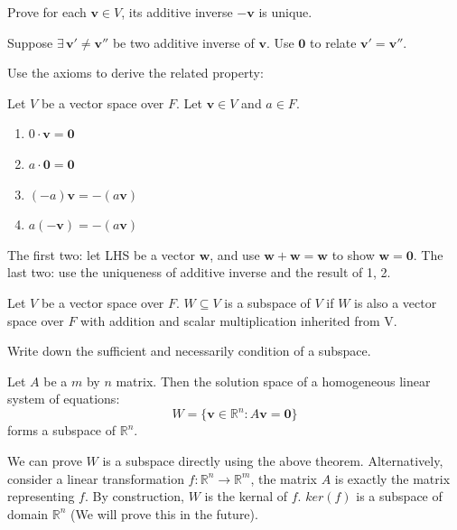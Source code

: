 \documentclass[12pt]{article}
\begin{document}
\begin{exercise}
    Prove for each $\mathbf{v}\in V$, its additive inverse $-\mathbf{v}$ is unique.
\end{exercise}
\begin{pf}
Suppose $\exists\,\mathbf{v'}\neq \mathbf{v''}$ be two additive inverse of $\mathbf{v}.$
Use $\mathbf{0}$ to relate $\mathbf{v'}=\mathbf{v''}.$
\end{pf}


Use the axioms to derive the related property:
\begin{property}
Let $V$ be a vector space over $F$. Let $\mathbf{v}\in V$ and $a\in F$.
\begin{enumerate}
    \item $0\cdot\mathbf{v}=\mathbf{0}$
    \item $a\cdot\mathbf{0}=\mathbf{0}$
    \item $(-a)\mathbf{v} = -(a\mathbf{v})$
    \item $a(-\mathbf{v}) = -(a\mathbf{v})$
\end{enumerate}
\end{property}

\begin{pf}
    The first two: let LHS be a vector $\mathbf{w}$, and use $\mathbf{w}+\mathbf{w}=\mathbf{w}$ to show $\mathbf{w}=\mathbf{0}.$
    The last two: use the uniqueness of additive inverse and the result of 1, 2.
\end{pf}


\begin{definition}
Let $V$ be a vector space over $F$. $W\subseteq V$ is a subspace of $V$ if $W$ is also a vector space over $F$ with addition and scalar multiplication inherited from V.
\end{definition}

\begin{exercise}
    Write down the sufficient and necessarily condition of a subspace.
\end{exercise}

\begin{theorem}
    Let $A$ be a $m$ by $n$ matrix. Then the solution space of a homogeneous linear system of equations:
    \[W=\{\mathbf{v}\in \mathbb{R}^n: A\mathbf{v}=\mathbf{0}\}\]
    forms a subspace of $\mathbb{R}^n$.
\end{theorem}

\begin{pf}
    We can prove $W$ is a subspace directly using the above theorem.
    Alternatively, consider a linear transformation $f: \mathbb{R}^n\rightarrow\mathbb{R}^m$, the matrix $A$ is exactly the matrix representing $f$.
    By construction, $W$ is the kernal of $f$. $ker(f)$ is a subspace of domain $\mathbb{R}^n$ (We will prove this in the future).
\end{pf}
\end{document}
